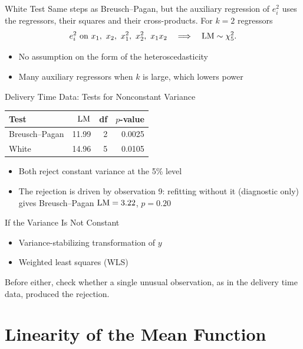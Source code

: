 \begin{frame}{White Test}
    Same steps as Breusch--Pagan, but the auxiliary regression of $e_i^2$ uses the regressors, their squares and their cross-products. For $k=2$ regressors
    \[
        e_i^2 \text{ on } x_1,\ x_2,\ x_1^2,\ x_2^2,\ x_1x_2 \quad\Longrightarrow\quad \LM\sim\chi^2_5 .
    \]
    \begin{itemize}
        \item No assumption on the form of the heteroscedasticity
        \item Many auxiliary regressors when $k$ is large, which lowers power
    \end{itemize}
\end{frame}


\begin{frame}{Delivery Time Data: Tests for Nonconstant Variance}
    \begin{center}
        \begin{tabular}{lrrr}
            \toprule
            Test & $\mathrm{LM}$ & df & $p$-value \\
            \midrule
            Breusch--Pagan & 11.99 & 2 & 0.0025 \\
            White & 14.96 & 5 & 0.0105 \\
            \bottomrule
        \end{tabular}
    \end{center}
    \begin{itemize}
        \item Both reject constant variance at the 5\% level
        \item The rejection is driven by observation 9: refitting without it (diagnostic only) gives Breusch--Pagan $\mathrm{LM}=3.22$, $p=0.20$
    \end{itemize}
\end{frame}


\begin{frame}{If the Variance Is Not Constant}
    \begin{itemize}
        \item Variance-stabilizing transformation of $y$
        \item Weighted least squares (WLS)
    \end{itemize}
    Before either, check whether a single unusual observation, as in the delivery time data, produced the rejection.
\end{frame}


\section{Linearity of the Mean Function}



